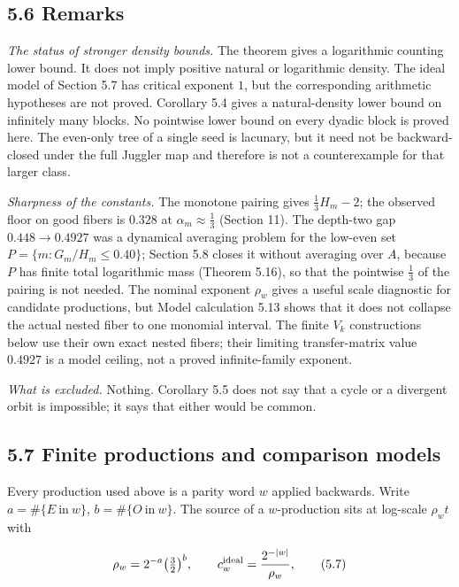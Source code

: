 \documentclass[11pt,a4paper]{article}
\begin{document}
\subsection{5.6 Remarks}\label{remarks}

\emph{The status of stronger density bounds.} The theorem gives a
logarithmic counting lower bound. It does not imply positive natural or
logarithmic density. The ideal model of Section 5.7 has critical
exponent \(1\), but the corresponding arithmetic hypotheses are not
proved. Corollary 5.4 gives a natural-density lower bound on infinitely
many blocks. No pointwise lower bound on every dyadic block is proved
here. The even-only tree of a single seed is lacunary, but it need not
be backward-closed under the full Juggler map and therefore is not a
counterexample for that larger class.

\emph{Sharpness of the constants.} The monotone pairing gives
\(\tfrac13H_m-2\); the observed floor on good fibers is \(0.328\) at
\(\alpha_m\approx\tfrac13\) (Section 11). The depth-two gap
\(0.448\to 0.4927\) was a dynamical averaging problem for the low-even
set \(P=\{m:G_m/H_m\le 0.40\}\); Section 5.8 closes it without averaging
over \(A\), because \(P\) has finite total logarithmic mass (Theorem
5.16), so that the pointwise \(\tfrac13\) of the pairing is not needed.
The nominal exponent \(\rho_w\) gives a useful scale diagnostic for
candidate productions, but Model calculation 5.13 shows that it does not
collapse the actual nested fiber to one monomial interval. The finite
\(V_k\) constructions below use their own exact nested fibers; their
limiting transfer-matrix value \(0.4927\) is a model ceiling, not a
proved infinite-family exponent.

\emph{What is excluded.} Nothing. Corollary 5.5 does not say that a
cycle or a divergent orbit is impossible; it says that either would be
common.

\subsection{5.7 Finite productions and comparison
models}\label{finite-productions-and-comparison-models}

Every production used above is a parity word \(w\) applied backwards.
Write \(a=\#\{E\ \text{in}\ w\}\), \(b=\#\{O\ \text{in}\ w\}\). The
source of a \(w\)-production sits at log-scale \(\rho_wt\) with

\[
\rho_w=2^{-a}\bigl(\tfrac32\bigr)^{b},
\qquad
c^{\rm ideal}_w=\frac{2^{-|w|}}{\rho_w},
\tag{5.7}
\]
\end{document}
